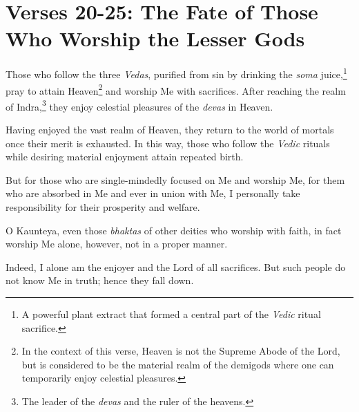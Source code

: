 \section{Verses 20-25: The Fate of Those Who Worship the Lesser Gods}\label{sec-verses-20-25-the-fate-of-those-who-worship-the-lesser-gods}

{Those who follow the three \textit{Vedas}, purified from sin by drinking the \textit{soma} juice,\footnote{A powerful plant extract that formed a central part of the \textit{Vedic} ritual sacrifice.} pray to attain Heaven\footnote{In the context of this verse, Heaven is not the Supreme Abode of the Lord, but is considered to be the material realm of the demigods where one can temporarily enjoy celestial pleasures.} and worship Me with sacrifices. After reaching the realm of Indra,\footnote{The leader of the \textit{devas} and the ruler of the heavens.} they enjoy celestial pleasures of the \textit{devas} in Heaven.}

{Having enjoyed the vast realm of Heaven, they return to the world of mortals once their merit is exhausted. In this way, those who follow the \textit{Vedic} rituals while desiring material enjoyment attain repeated birth.}

{But for those who are single-mindedly focused on Me and worship Me, for them who are absorbed in Me and ever in union with Me, I personally take responsibility for their prosperity and welfare.}

{O Kaunteya, even those \textit{bhaktas} of other deities who worship with faith, in fact worship Me alone, however, not in a proper manner.}

{Indeed, I alone am the enjoyer and the Lord of all sacrifices. But such people do not know Me in truth; hence they fall down.}

